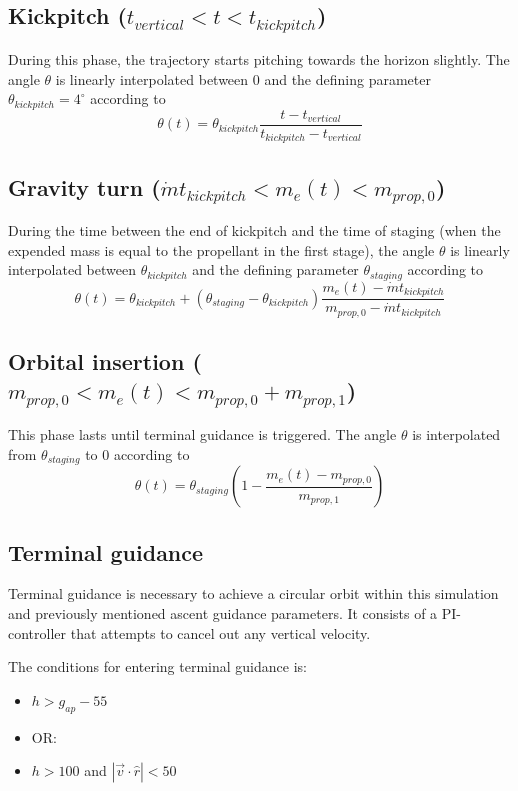 \documentclass[11pt]{article}
\begin{document}
\subsection{Kickpitch ($t_{vertical} < t < t_{kickpitch}$)}
During this phase, the trajectory starts pitching towards the horizon slightly.
The angle $\theta$ is linearly interpolated between 0 and the defining parameter $\theta_{kickpitch} = 4^{\circ}$ according to
$$
\theta(t) = \theta_{kickpitch} \frac{t - t_{vertical}}{t_{kickpitch} - t_{vertical}}
$$

\subsection{Gravity turn ($\dot{m} t_{kickpitch} < m_e(t) < m_{prop,0}$)}
During the time between the end of kickpitch and the time of staging (when the expended mass is equal to the propellant in the first stage),
the angle $\theta$ is linearly interpolated between $\theta_{kickpitch}$ and the defining parameter $\theta_{staging}$ according to
$$
\theta(t) = \theta_{kickpitch} + \left( \theta_{staging} - \theta_{kickpitch} \right) \frac{m_e(t) - \dot{m} t_{kickpitch}}{m_{prop,0} - \dot{m} t_{kickpitch}}
$$

\subsection{Orbital insertion ($m_{prop,0} < m_e(t) < m_{prop,0} + m_{prop,1}$)}
This phase lasts until terminal guidance is triggered. The angle $\theta$ is interpolated from $\theta_{staging}$ to 0 according to
$$
\theta(t) = \theta_{staging} \left( 1 - \frac{m_e(t) - m_{prop,0}}{m_{prop,1}} \right)
$$

\subsection{Terminal guidance}
Terminal guidance is necessary to achieve a circular orbit within this simulation and previously mentioned ascent guidance parameters.
It consists of a PI-controller that attempts to cancel out any vertical velocity.

The conditions for entering terminal guidance is:
\begin{itemize}
  \item $h > g_{ap} - 55$
  \item OR:
  \item $h > 100$ and $\left| \vec{v} \cdot \hat{r} \right| < 50$
\end{itemize}
\end{document}
